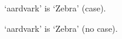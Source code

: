\documentclass[12pt]{article}
\begin{document}
`aardvark' is
`Zebra' (case). 

`aardvark' is
`Zebra' (no case). 
\end{document}

